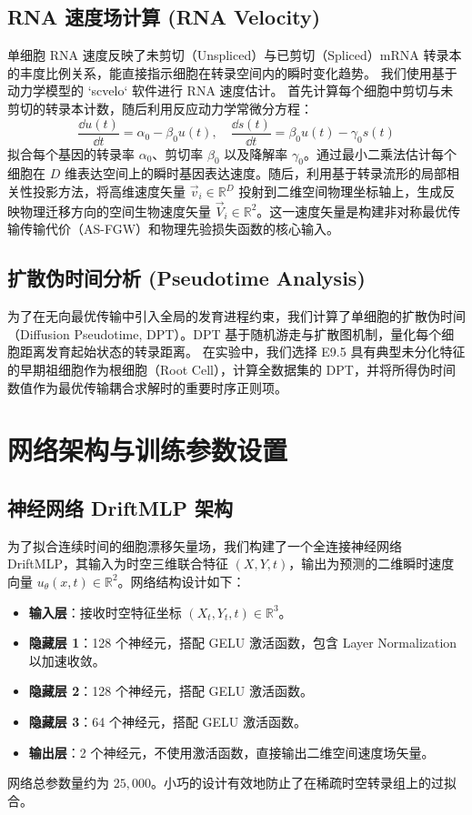 \subsection{RNA 速度场计算 (RNA Velocity)}
单细胞 RNA 速度反映了未剪切（Unspliced）与已剪切（Spliced）mRNA 转录本的丰度比例关系，能直接指示细胞在转录空间内的瞬时变化趋势。
我们使用基于动力学模型的 `scvelo` 软件\cite{Bergen2020}进行 RNA 速度估计。
首先计算每个细胞中剪切与未剪切的转录本计数，随后利用反应动力学常微分方程：
\begin{equation}
    \frac{\dd u(t)}{\dd t} = \alpha_0 - \beta_0 u(t), \quad \frac{\dd s(t)}{\dd t} = \beta_0 u(t) - \gamma_0 s(t)
\end{equation}
拟合每个基因的转录率 $\alpha_0$、剪切率 $\beta_0$ 以及降解率 $\gamma_0$。通过最小二乘法估计每个细胞在 $D$ 维表达空间上的瞬时基因表达速度。随后，利用基于转录流形的局部相关性投影方法，将高维速度矢量 $\vec{v}_i \in \mathbb{R}^D$ 投射到二维空间物理坐标轴上，生成反映物理迁移方向的空间生物速度矢量 $\vec{V}_i \in \mathbb{R}^2$。这一速度矢量是构建非对称最优传输传输代价（AS-FGW）和物理先验损失函数的核心输入。

\subsection{扩散伪时间分析 (Pseudotime Analysis)}
为了在无向最优传输中引入全局的发育进程约束，我们计算了单细胞的扩散伪时间（Diffusion Pseudotime, DPT）\cite{Bergen2020}。DPT 基于随机游走与扩散图机制，量化每个细胞距离发育起始状态的转录距离。
在实验中，我们选择 E9.5 具有典型未分化特征的早期祖细胞作为根细胞（Root Cell），计算全数据集的 DPT，并将所得伪时间数值作为最优传输耦合求解时的重要时序正则项。

\section{网络架构与训练参数设置}

\subsection{神经网络 DriftMLP 架构}
为了拟合连续时间的细胞漂移矢量场，我们构建了一个全连接神经网络 DriftMLP，其输入为时空三维联合特征 $(X, Y, t)$，输出为预测的二维瞬时速度向量 $u_\theta(x, t) \in \mathbb{R}^2$。网络结构设计如下：
\begin{itemize}
    \item \textbf{输入层}：接收时空特征坐标 $(X_t, Y_t, t) \in \mathbb{R}^3$。
    \item \textbf{隐藏层 1}：128 个神经元，搭配 GELU 激活函数，包含 Layer Normalization 以加速收敛。
    \item \textbf{隐藏层 2}：128 个神经元，搭配 GELU 激活函数。
    \item \textbf{隐藏层 3}：64 个神经元，搭配 GELU 激活函数。
    \item \textbf{输出层}：2 个神经元，不使用激活函数，直接输出二维空间速度场矢量。
\end{itemize}
网络总参数量约为 $25,000$。小巧的设计有效地防止了在稀疏时空转录组上的过拟合。

